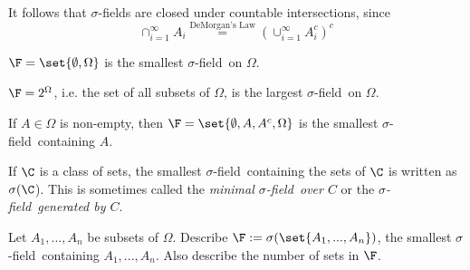 \documentclass{article} %
\renewcommand{\sf}{$\sigma$-field}
\begin{document}
\begin{remark}
It follows that $\sigma$-fields are closed under countable intersections, since
\[ \cap_{i=1}^\infty A_i \stackrel{\text{DeMorgan's Law}}{=} (\cup_{i=1}^\infty A_i^c)^c \]	
\end{remark}

\begin{example}
$\F =\set{\emptyset, \Omega}$ is the smallest \sf\ on $\Omega$. 
\end{example}

\begin{example}
	$\F =2^\Omega$, i.e. the set of all subsets of $\Omega$, is the largest \sf\ on $\Omega$.
\end{example}

\begin{example}
If $A \in \Omega$ is non-empty, then $\F = \set{\emptyset, A, A^c, \Omega}$ is the smallest \sf\ containing $A$.
\end{example}

\begin{notation}
If $\C$ is a class of sets, the smallest \sf\ containing the sets of $\C$ is written as $\sigma(\C$).  This is sometimes called the \textit{minimal \sf\ over $C$} or the \textit{\sf\ generated by $C$}. 
\end{notation}
	
\begin{problem}{}
\label{prob:minimal_sigma_field_containing_n_subsets}
Let $A_1,...,A_n$ be subsets of $\Omega$.  Describe $\F := \sigma(\set{A_1,...,A_n})$, the smallest \sf\ containing $A_1,...,A_n$.  Also describe the number of sets in $\F$.    
\end{problem}
\end{document}
